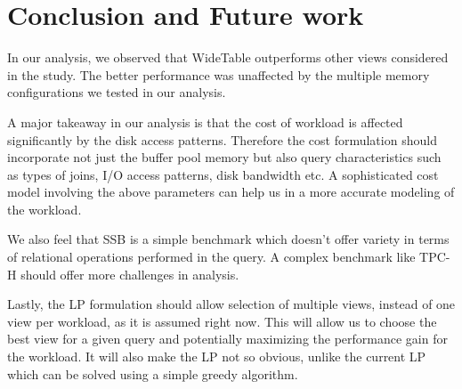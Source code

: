 \section{Conclusion and Future work}\label{sec:conclusions}
In our analysis, we observed that WideTable outperforms other views considered in the 
study.
The better performance was unaffected by the multiple memory configurations we tested 
in our analysis. 

A major takeaway in our analysis is that the cost of workload is affected significantly by 
the disk access patterns. 
Therefore the cost formulation should incorporate not just the buffer pool memory but 
also query characteristics such as types of joins, I/O access patterns, disk bandwidth etc. 
A sophisticated cost model involving the above parameters can help us in a more 
accurate modeling of the workload. 

We also feel that SSB is a simple benchmark which doesn't offer variety in terms of 
relational operations performed in the query. 
A complex benchmark like TPC-H should offer more challenges in analysis. 

Lastly, the LP formulation should allow selection of multiple views, instead of one view 
per workload, as it is assumed right now. 
This will allow us to choose the best view for a given query and potentially maximizing 
the performance gain for the workload. 
It will also make the LP not so obvious, unlike the current LP which can be solved using a 
simple greedy algorithm.